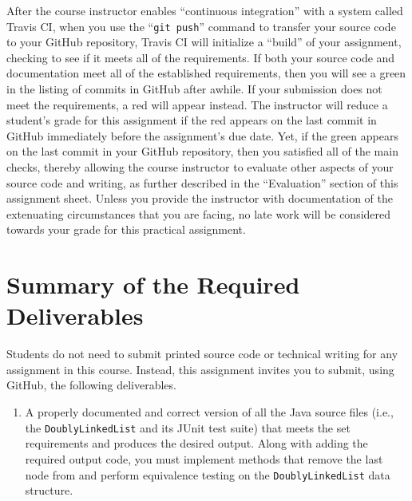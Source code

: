 \documentclass[11pt]{article}
\newcommand{\mainprogram}{\lstinline{DoublyLinkedList}}
\newcommand{\gitpush}{\command{git push}}
\newcommand{\command}[1]{``\lstinline{#1}''}
\newcommand{\program}[1]{\lstinline{#1}}
\newcommand{\step}[1]{``{#1}''}
\newcommand{\checkmark}{\ding{51}}
\newcommand{\naughtmark}{\ding{55}}
\begin{document}
After the course instructor enables \step{continuous integration} with a system
called Travis CI, when you use the \gitpush{} command to transfer your source
code to your GitHub repository, Travis CI will initialize a \step{build} of your
assignment, checking to see if it meets all of the requirements. If both your
source code and documentation meet all of the established requirements, then you
will see a green \checkmark{} in the listing of commits in GitHub after awhile.
If your submission does not meet the requirements, a red \naughtmark{} will
appear instead. The instructor will reduce a student's grade for this assignment
if the red \naughtmark{} appears on the last commit in GitHub immediately before
the assignment's due date. Yet, if the green \checkmark{} appears on the last
commit in your GitHub repository, then you satisfied all of the main checks,
thereby allowing the course instructor to evaluate other aspects of your source
code and writing, as further described in the \step{Evaluation} section of this
assignment sheet. Unless you provide the instructor with documentation of the
extenuating circumstances that you are facing, no late work will be considered
towards your grade for this practical assignment.

\section*{Summary of the Required Deliverables}

\noindent Students do not need to submit printed source code or technical
writing for any assignment in this course. Instead, this assignment invites you
to submit, using GitHub, the following deliverables.

\vspace*{-.1in}

\begin{enumerate}

  \setlength{\itemsep}{0in}

\item A properly documented and correct version of all the Java source files
  (i.e., the \mainprogram{} and its JUnit test suite) that meets the set
  requirements and produces the desired output. Along with adding the required
  output code, you must implement methods that remove the last node from and
  perform equivalence testing on the \program{DoublyLinkedList} data structure.

\end{enumerate}
\end{document}
